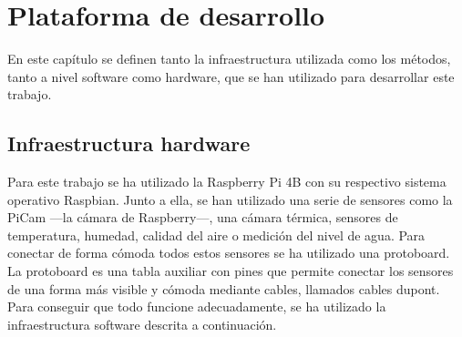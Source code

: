 \chapter{Plataforma de desarrollo}
\label{cap:capitulo3}



\vspace{1cm}

En este capítulo se definen tanto la infraestructura utilizada como los métodos, tanto a nivel software como hardware, que se han utilizado para desarrollar este trabajo.\\

\section{Infraestructura hardware}
\label{sec:hw}
Para este trabajo se ha utilizado la Raspberry Pi 4B con su respectivo sistema operativo Raspbian. Junto a ella, se han utilizado una serie de sensores como la PiCam ---la cámara de Raspberry---, una cámara térmica, sensores de temperatura, humedad, calidad del aire o medición del nivel de agua. Para conectar de forma cómoda todos estos sensores se ha utilizado una protoboard. La protoboard es una tabla auxiliar con pines que permite conectar los sensores de una forma más visible y cómoda mediante cables, llamados cables dupont.\\
Para conseguir que todo funcione adecuadamente, se ha utilizado la infraestructura software descrita a continuación.\\
 
